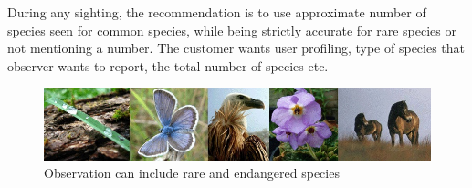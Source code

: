 During any sighting, the recommendation is to use approximate number of species seen for common species, while being strictly accurate for rare species or not mentioning a number. The customer wants user profiling, type of species that observer wants to report, the total number of species etc.

\begin{figure}[htb]
	\centering
	\includegraphics[width=1\textwidth]{prestudy/field_study/flora_fauna_Nikola.jpg}
	\caption{Observation can include rare and endangered species}
	\label{fig:field_study_species}
\end{figure}


